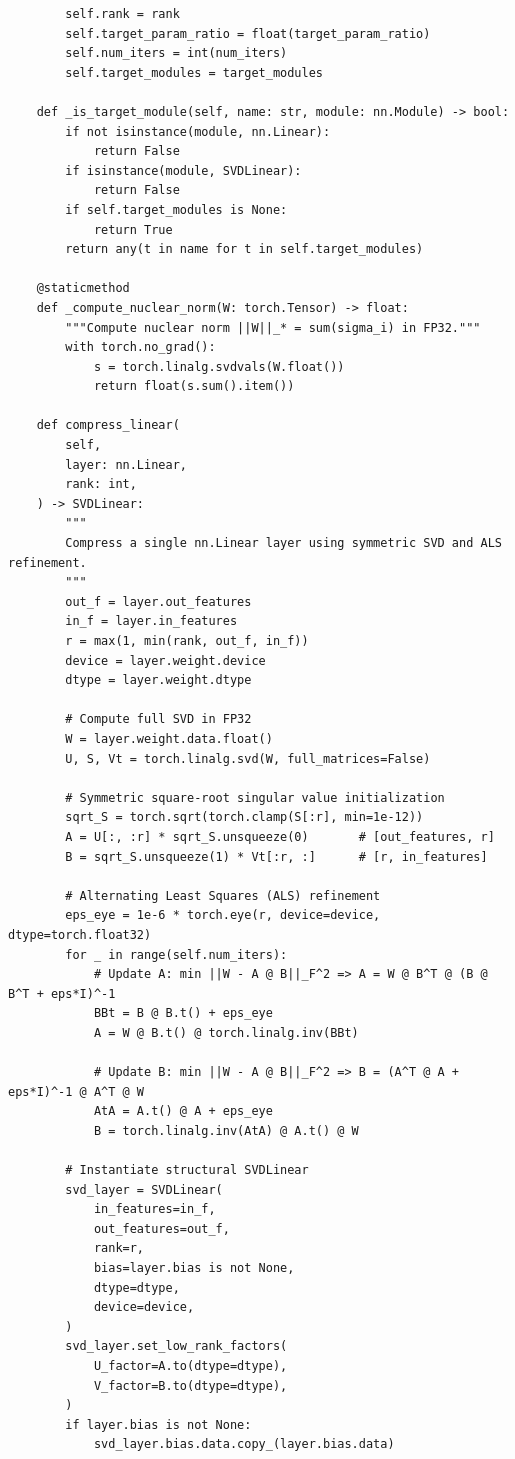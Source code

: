\begin{lstlisting}
        self.rank = rank
        self.target_param_ratio = float(target_param_ratio)
        self.num_iters = int(num_iters)
        self.target_modules = target_modules

    def _is_target_module(self, name: str, module: nn.Module) -> bool:
        if not isinstance(module, nn.Linear):
            return False
        if isinstance(module, SVDLinear):
            return False
        if self.target_modules is None:
            return True
        return any(t in name for t in self.target_modules)

    @staticmethod
    def _compute_nuclear_norm(W: torch.Tensor) -> float:
        """Compute nuclear norm ||W||_* = sum(sigma_i) in FP32."""
        with torch.no_grad():
            s = torch.linalg.svdvals(W.float())
            return float(s.sum().item())

    def compress_linear(
        self,
        layer: nn.Linear,
        rank: int,
    ) -> SVDLinear:
        """
        Compress a single nn.Linear layer using symmetric SVD and ALS refinement.
        """
        out_f = layer.out_features
        in_f = layer.in_features
        r = max(1, min(rank, out_f, in_f))
        device = layer.weight.device
        dtype = layer.weight.dtype

        # Compute full SVD in FP32
        W = layer.weight.data.float()
        U, S, Vt = torch.linalg.svd(W, full_matrices=False)

        # Symmetric square-root singular value initialization
        sqrt_S = torch.sqrt(torch.clamp(S[:r], min=1e-12))
        A = U[:, :r] * sqrt_S.unsqueeze(0)       # [out_features, r]
        B = sqrt_S.unsqueeze(1) * Vt[:r, :]      # [r, in_features]

        # Alternating Least Squares (ALS) refinement
        eps_eye = 1e-6 * torch.eye(r, device=device, dtype=torch.float32)
        for _ in range(self.num_iters):
            # Update A: min ||W - A @ B||_F^2 => A = W @ B^T @ (B @ B^T + eps*I)^-1
            BBt = B @ B.t() + eps_eye
            A = W @ B.t() @ torch.linalg.inv(BBt)

            # Update B: min ||W - A @ B||_F^2 => B = (A^T @ A + eps*I)^-1 @ A^T @ W
            AtA = A.t() @ A + eps_eye
            B = torch.linalg.inv(AtA) @ A.t() @ W

        # Instantiate structural SVDLinear
        svd_layer = SVDLinear(
            in_features=in_f,
            out_features=out_f,
            rank=r,
            bias=layer.bias is not None,
            dtype=dtype,
            device=device,
        )
        svd_layer.set_low_rank_factors(
            U_factor=A.to(dtype=dtype),
            V_factor=B.to(dtype=dtype),
        )
        if layer.bias is not None:
            svd_layer.bias.data.copy_(layer.bias.data)


\end{lstlisting}
